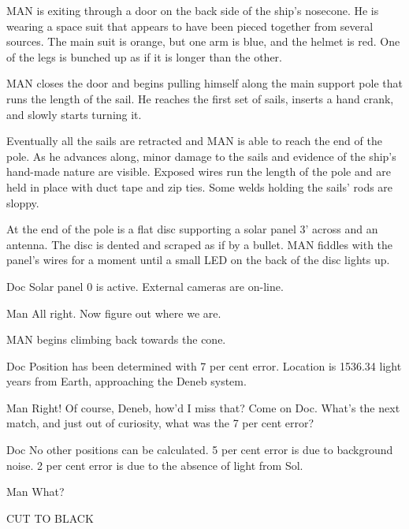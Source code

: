 \documentclass{screenplay}
\begin{document}
MAN is exiting through a door on the back side of the ship's nosecone.  He is wearing a space suit that appears to have been pieced together from several sources.  The main suit is orange, but one arm is blue, and the helmet is red.  One of the legs is bunched up as if it is longer than the other.

MAN closes the door and begins pulling himself along the main support pole that runs the length of the sail.  He reaches the first set of sails, inserts a hand crank, and slowly starts turning it.

Eventually all the sails are retracted and MAN is able to reach the end of the pole.  As he advances along, minor damage to the sails and evidence of the ship's hand-made nature are visible.  Exposed wires run the length of the pole and are held in place with duct tape and zip ties.  Some welds holding the sails' rods are sloppy.

At the end of the pole is a flat disc supporting a solar panel 3' across and an antenna.  The disc is dented and scraped as if by a bullet.  MAN fiddles with the panel's wires for a moment until a small LED on the back of the disc lights up.
\begin{dialogue}{Doc}
Solar panel 0 is active.  External cameras are on-line.
\end{dialogue}
\begin{dialogue}{Man}
All right.  Now figure out where we are.
\end{dialogue}
MAN begins climbing back towards the cone.
\begin{dialogue}{Doc}
Position has been determined with 7 per cent error.  Location is 1536.34 light years from Earth, approaching the Deneb system.
\end{dialogue}
\begin{dialogue}{Man}
Right!  Of course, Deneb, how'd I miss that?  Come on Doc.  What's the next match, and just out of curiosity, what was the 7 per cent error?
\end{dialogue}
\begin{dialogue}{Doc}
No other positions can be calculated.  5 per cent error is due to background noise.  2 per cent error is due to the absence of light from Sol.
\end{dialogue}
\begin{dialogue}{Man}
What?
\end{dialogue}
CUT TO BLACK
\end{document}
